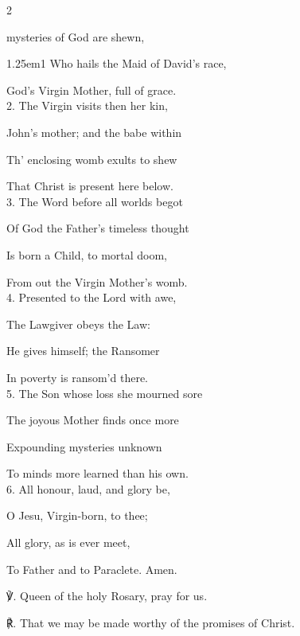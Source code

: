 \begin{paracol}{2}
\sloppy

\firstEvensong
{}

\firstEvensongHymn
{} mysteries of God are shewn,


\begin{hangparas}{1.25em}{1}
Who hails the Maid of David’s race,

God's Virgin Mother, full of grace.\\

2. The Virgin visits then her kin,

John’s mother; and the babe within

Th' enclosing womb exults to shew

That Christ is present here below.\\

3. The Word before all worlds begot

Of God the Father’s timeless thought

Is born a Child, to mortal doom,

From out the Virgin Mother’s womb.\\

4. Presented to the Lord with awe,

The Lawgiver obeys the Law:

He gives himself; the Ransomer

In poverty is ransom'd there.\\

5. The Son whose loss she mourned sore

The joyous Mother finds once more

Expounding mysteries unknown

To minds more learned than his own.\\

6. All honour, laud, and glory be,

O Jesu, Virgin-born, to thee;

All glory, as is ever meet,

To Father and to Paraclete. Amen.\\
\end{hangparas}

℣. Queen of the holy Rosary, pray for us.

℟. That we may be made worthy of the promises of Christ.


\end{paracol}
